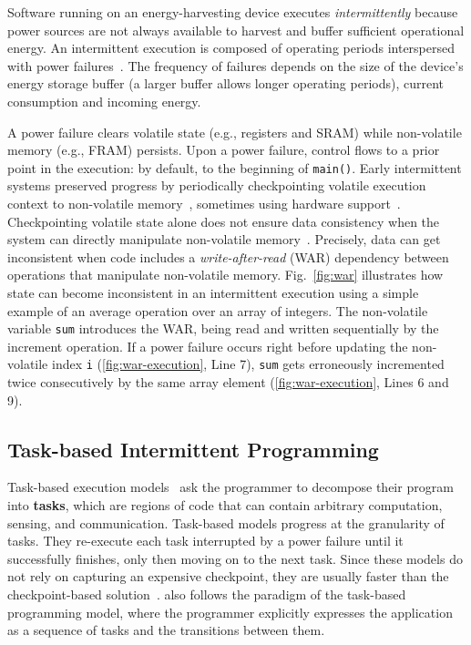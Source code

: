 Software running on an energy-harvesting device executes {\em intermittently} because power sources are not always available to harvest and buffer sufficient operational energy. An intermittent execution is composed of operating periods interspersed with power failures~\cite{dino,chain,alpaca,ratchet}. The frequency of failures depends on the size of the device's energy storage buffer (a larger buffer allows longer operating periods), current consumption and incoming energy.

A power failure clears volatile state (e.g., registers and SRAM) while non-volatile memory (e.g., FRAM) persists. Upon a power failure, control flows to a prior point in the execution: by default, to the beginning of {\tt main()}. Early intermittent systems preserved progress by periodically checkpointing volatile execution context to non-volatile memory~\cite{mementos}, sometimes using hardware support~\cite{mottola2017harvos,hibernusplusplus,hibernus,idetic,quickrecall}. Checkpointing volatile state alone does not ensure data consistency when the system can directly manipulate non-volatile memory~\cite{mspcdino}. Precisely, data can get inconsistent when code includes a \emph{write-after-read} (WAR) dependency between operations that manipulate non-volatile memory. Fig.~\ref{fig:war} illustrates how state can become inconsistent in an intermittent execution using a simple example of an average operation over an array of integers.
The non-volatile variable \texttt{sum} introduces the WAR, being read and written sequentially by the increment operation. If a power failure occurs right before updating the non-volatile index \texttt{i} (\ref{fig:war-execution}, Line 7), \texttt{sum} gets erroneously incremented twice consecutively by the same array element (\ref{fig:war-execution}, Lines 6 and 9). 

\subsection{Task-based Intermittent Programming}
\label{section:background_task_computing}

Task-based execution models~\cite{dino,chain,alpaca} ask the programmer to decompose their program into \textbf{tasks}, which are regions of code that can contain arbitrary computation, sensing, and communication. Task-based models progress at the granularity of tasks. They re-execute each task interrupted by a power failure until it successfully finishes, only then moving on to the next task. Since these models do not rely on capturing an expensive checkpoint, they are usually faster than the checkpoint-based solution~\cite{chain, alpaca}.  \sys also follows the paradigm of the task-based programming model, where the programmer explicitly expresses the application as a sequence of tasks and the transitions between them.

